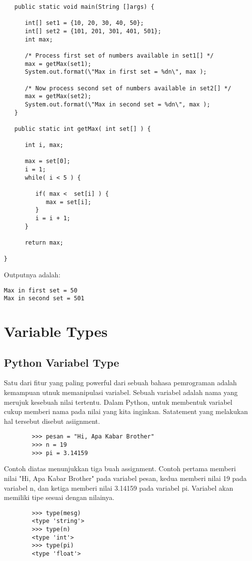 \begin{enumerate}
\begin {verbatim}
   public static void main(String []args) {
  
      int[] set1 = {10, 20, 30, 40, 50};
      int[] set2 = {101, 201, 301, 401, 501};
      int max;
 
      /* Process first set of numbers available in set1[] */
      max = getMax(set1);
      System.out.format(\"Max in first set = %
 
      /* Now process second set of numbers available in set2[] */
      max = getMax(set2);
      System.out.format(\"Max in second set = %
   }
    
   public static int getMax( int set[] ) {
  
      int i, max;
    
      max = set[0];
      i = 1;    
      while( i < 5 ) {
 
         if( max <  set[i] ) {
            max = set[i];
         }
         i = i + 1;
      }
     
      return max;
   
}
\end {verbatim}
Outputnya adalah: 
\begin {verbatim}
Max in first set = 50
Max in second set = 501
\end {verbatim}

\section{Variable Types}
\subsection{Python Variabel Type}
Satu dari fitur yang paling powerful dari sebuah bahasa pemrograman adalah kemampuan utnuk memanipulasi variabel. Sebuah variabel adalah nama yang merujuk kesebuah nilai tertentu. Dalam Python, untuk membentuk variabel cukup memberi nama pada nilai yang kita inginkan. Satatement yang melakukan hal tersebut disebut asiignment.
    \begin{verbatim}
        >>> pesan = "Hi, Apa Kabar Brother"
        >>> n = 19
        >>> pi = 3.14159
     \end{verbatim}
Contoh diatas menunjukkan tiga buah assignment. Contoh pertama memberi nilai "Hi, Apa Kabar Brother" pada variabel pesan, kedua memberi nilai 19 pada variabel n, dan ketiga memberi nilai 3.14159 pada variabel pi. Variabel akan memiliki tipe sesuai dengan nilainya.
    \begin{verbatim}
        >>> type(mesg)
        <type 'string'>
        >>> type(n)
        <type 'int'>
        >>> type(pi)
        <type 'float'>
     \end{verbatim}


\end{enumerate}
